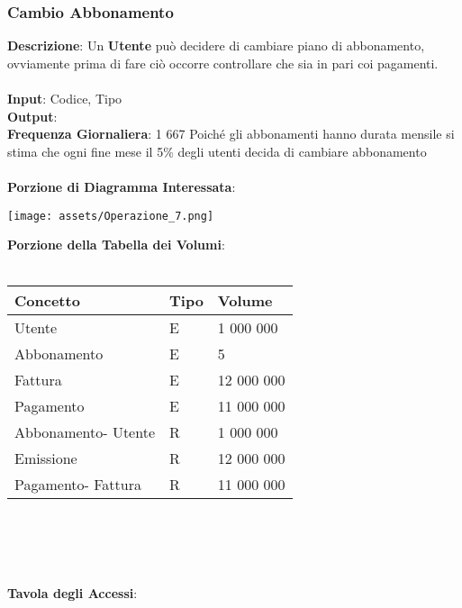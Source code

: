 \documentclass{article}
\begin{document}
\subsubsection{Cambio Abbonamento}
\textbf{Descrizione}: Un \textbf{Utente} può decidere di cambiare piano di abbonamento, ovviamente prima di fare ciò occorre controllare che sia in pari coi pagamenti. \\ \\
\textbf{Input}: Codice, Tipo \\
\textbf{Output}: \\
\textbf{Frequenza Giornaliera}: 1 667 Poiché gli abbonamenti hanno durata mensile si stima che ogni fine mese il 5\% degli utenti decida di cambiare abbonamento \\ \\
\textbf{Porzione di Diagramma Interessata}: \\
%
%
%
%
%
%
%
\begin{center}
\centering
\texttt{[image: assets/Operazione\_7.png]}
\end{center} 
\textbf{Porzione della Tabella dei Volumi}: \\ \\
\begin{tabular}{|C{2.6cm}|C{2.6cm}|C{2.6cm}|}
\hline
    \textbf{Concetto} & \textbf{Tipo} & \textbf{Volume} \\
\hline
 Utente & E & 1 000 000 \\
\hline
 Abbonamento & E & 5 \\
\hline
 Fattura & E & 12 000 000 \\
\hline
 Pagamento & E & 11 000 000 \\
\hline
 Abbonamento- Utente & R & 1 000 000 \\
\hline
 Emissione & R & 12 000 000 \\
\hline
 Pagamento- Fattura & R & 11 000 000 \\
\hline
\end{tabular} \\ \\ \\ \\ 
\textbf{Tavola degli Accessi}: \\ \\
\end{document}
